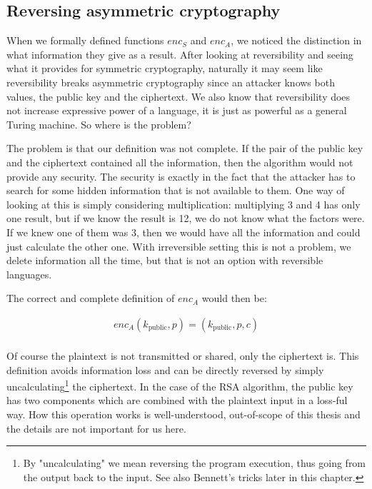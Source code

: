 \documentclass[a4paper,10pt,openright]{memoir}
\def\enc{\ensuremath{\mathit{enc}}}
\begin{document}
\subsection{Reversing asymmetric cryptography}
\label{sec:asym_rev}

When we formally defined functions $\enc_S$ and $\enc_A$, we noticed 
the distinction in what information they give as a result. After 
looking at reversibility and seeing what it provides for symmetric 
cryptography, naturally it may seem like reversibility breaks 
asymmetric cryptography since an attacker knows both values, the public 
key and the ciphertext. We also know that reversibility does not 
increase expressive power of a language, it is just as powerful as a 
general Turing machine. So where is the problem?

The problem is that our definition was not complete. If the pair of the 
public key and the ciphertext contained all the information, then the 
algorithm would not provide any security. The security is exactly in 
the fact that the attacker has to search for some hidden information 
that is not available to them. One way of looking at this is simply 
considering multiplication: multiplying 3 and 4 has only one result, 
but if we know the result is 12, we do not know what the factors were. 
If we knew one of them was 3, then we would have all the information 
and could just calculate the other one. With irreversible setting this 
is not a problem, we delete information all the time, but that is not 
an option with reversible languages.

The correct and complete definition of $\enc_A$ would then be:

\begin{align*}
\enc_A(k_\text{public},p) = (k_\text{public}, p, c) \\
\end{align*}

Of course the plaintext is not transmitted or shared, only the 
ciphertext is. This definition avoids information loss and can be 
directly reversed by simply uncalculating\footnote{By "uncalculating" 
we mean reversing the program execution, thus going from the output 
back to the input. See also Bennett's tricks later in this chapter.} 
the ciphertext. In the case of the RSA algorithm, the public key has 
two components which are combined with the plaintext input in a 
loss-ful way. How this operation works is well-understood, out-of-scope 
of this thesis and the details are not important for us here.
\end{document}
